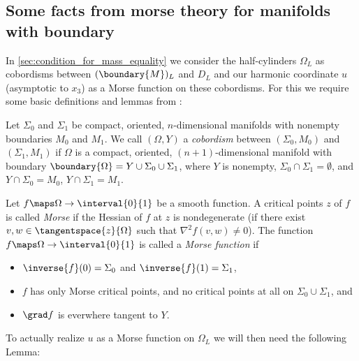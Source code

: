 \documentclass[titlepage,numbers=noenddot,oneside,%
cleardoublepage=empty,paper=a4,fontsize=11pt,%
english,%
]{scrartcl}
\begin{document}
\subsection{Some facts from morse theory for manifolds with boundary}\label{sec:morse_theory}
In \cref{sec:condition_for_mass_equality} we consider the half-cylinders \( \Omega_L \) as cobordisms between \( (\boundary{M})_L \) and \( D_L \) and our harmonic coordinate \( u \) (asymptotic to \( x_3 \)) as a Morse function on these cobordisms. For this we require some basic definitions and lemmas from \cite{borodzikMorseTheoryManifolds2016}:
\begin{definition}\label{def:cobordism}
    Let \( \Sigma_0 \) and \( \Sigma_1 \) be compact, oriented, \( n \)-dimensional manifolds with nonempty boundaries \( M_0 \) and \( M_1 \). We call \( (\Omega,Y) \) a \emph{cobordism} between \( (\Sigma_0,M_0) \) and \( (\Sigma_1,M_1) \) if \( \Omega \) is a compact, oriented, \( (n+1) \)-dimensional manifold with boundary \( \boundary{\Omega}=Y\cup \Sigma_0\cup \Sigma_1 \), where \( Y \) is nonempty, \( \Sigma_0\cap \Sigma_1=\emptyset \), and \( Y\cap \Sigma_0=M_0 \), \( Y\cap \Sigma_1=M_1 \).
\end{definition}
\begin{definition}\label{def:morse_function}
    Let \( f\maps \Omega\to \interval{0}{1}   \) be a smooth function. A critical points \( z \) of \( f \) is called \emph{Morse} if the Hessian of \( f \) at \( z \) is nondegenerate (\ie if there exist \( v,w\in \tangentspace{z}{\Omega} \) such that \( \nabla^2 f(v,w)\neq 0 \)). The function \( f\maps \Omega\to \interval{0}{1} \) is called a \emph{Morse function} if 
    \begin{itemize}
        \item \( \inverse{f}(0)=\Sigma_0 \) and \( \inverse{f}(1)=\Sigma_1 \),
        \item \( f \) has only Morse critical points, and no critical points at all on \( \Sigma_0\cup \Sigma_1 \), and
        \item \( \grad f \) is everwhere tangent to \( Y \).
    \end{itemize}
\end{definition}
To actually realize \( u \) as a Morse function on \( \Omega_L \) we will then need the following Lemma:
\end{document}
